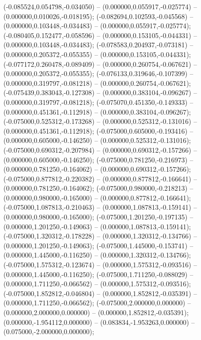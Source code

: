  (-0.085524,0.054798,-0.034050) -- (0.000000,0.055917,-0.025774) -- (0.000000,0.010026,-0.018195);
 (-0.082694,0.102593,-0.045568) -- (0.000000,0.103448,-0.034483) -- (0.000000,0.055917,-0.025774);
 (-0.080405,0.152477,-0.058596) -- (0.000000,0.153105,-0.044331) -- (0.000000,0.103448,-0.034483);
 (-0.078583,0.204937,-0.073181) -- (0.000000,0.205372,-0.055355) -- (0.000000,0.153105,-0.044331);
 (-0.077172,0.260478,-0.089409) -- (0.000000,0.260754,-0.067621) -- (0.000000,0.205372,-0.055355);
 (-0.076133,0.319646,-0.107399) -- (0.000000,0.319797,-0.081218) -- (0.000000,0.260754,-0.067621);
 (-0.075439,0.383043,-0.127308) -- (0.000000,0.383104,-0.096267) -- (0.000000,0.319797,-0.081218);
 (-0.075070,0.451350,-0.149333) -- (0.000000,0.451361,-0.112918) -- (0.000000,0.383104,-0.096267);
 (-0.075000,0.525312,-0.173268) -- (0.000000,0.525312,-0.131016) -- (0.000000,0.451361,-0.112918);
 (-0.075000,0.605000,-0.193416) -- (0.000000,0.605000,-0.146250) -- (0.000000,0.525312,-0.131016);
 (-0.075000,0.690312,-0.207984) -- (0.000000,0.690312,-0.157266) -- (0.000000,0.605000,-0.146250);
 (-0.075000,0.781250,-0.216973) -- (0.000000,0.781250,-0.164062) -- (0.000000,0.690312,-0.157266);
 (-0.075000,0.877812,-0.220382) -- (0.000000,0.877812,-0.166641) -- (0.000000,0.781250,-0.164062);
 (-0.075000,0.980000,-0.218213) -- (0.000000,0.980000,-0.165000) -- (0.000000,0.877812,-0.166641);
 (-0.075000,1.087813,-0.210463) -- (0.000000,1.087813,-0.159141) -- (0.000000,0.980000,-0.165000);
 (-0.075000,1.201250,-0.197135) -- (0.000000,1.201250,-0.149063) -- (0.000000,1.087813,-0.159141);
 (-0.075000,1.320312,-0.178228) -- (0.000000,1.320312,-0.134766) -- (0.000000,1.201250,-0.149063);
 (-0.075000,1.445000,-0.153741) -- (0.000000,1.445000,-0.116250) -- (0.000000,1.320312,-0.134766);
 (-0.075000,1.575312,-0.123674) -- (0.000000,1.575312,-0.093516) -- (0.000000,1.445000,-0.116250);
 (-0.075000,1.711250,-0.088029) -- (0.000000,1.711250,-0.066562) -- (0.000000,1.575312,-0.093516);
 (-0.075000,1.852812,-0.046804) -- (0.000000,1.852812,-0.035391) -- (0.000000,1.711250,-0.066562);
 (-0.075000,2.000000,0.000000) -- (0.000000,2.000000,0.000000) -- (0.000000,1.852812,-0.035391);
 (0.000000,-1.954112,0.000000) -- (0.083834,-1.953263,0.000000) -- (0.075000,-2.000000,0.000000);
